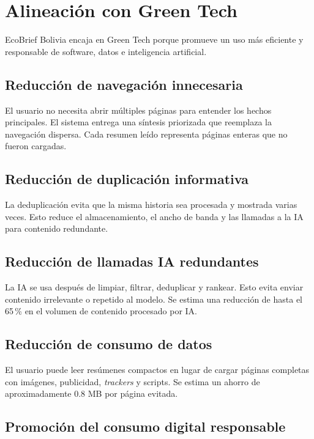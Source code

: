 \chapter{Alineaci\'on con Green Tech}

EcoBrief Bolivia encaja en Green Tech porque promueve un uso m\'as eficiente y responsable de software, datos e inteligencia artificial.

\section{Reducci\'on de navegaci\'on innecesaria}

El usuario no necesita abrir m\'ultiples p\'aginas para entender los hechos principales. El sistema entrega una s\'intesis priorizada que reemplaza la navegaci\'on dispersa. Cada resumen le\'ido representa p\'aginas enteras que no fueron cargadas.

\section{Reducci\'on de duplicaci\'on informativa}

La deduplicaci\'on evita que la misma historia sea procesada y mostrada varias veces. Esto reduce el almacenamiento, el ancho de banda y las llamadas a la IA para contenido redundante.

\section{Reducci\'on de llamadas IA redundantes}

La IA se usa despu\'es de limpiar, filtrar, deduplicar y rankear. Esto evita enviar contenido irrelevante o repetido al modelo. Se estima una reducci\'on de hasta el 65\,\% en el volumen de contenido procesado por IA.

\section{Reducci\'on de consumo de datos}

El usuario puede leer res\'umenes compactos en lugar de cargar p\'aginas completas con im\'agenes, publicidad, \textit{trackers} y scripts. Se estima un ahorro de aproximadamente 0.8 MB por p\'agina evitada.

\section{Promoci\'on del consumo digital responsable}

